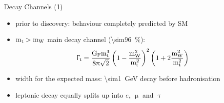 \begin{frame}{Decay Channels (1)}

	\begin{itemize}\itemfill
		\item prior to discovery: behaviour completely predicted by SM
		\item $\text{m}_{\text{t}} > \text{m}_{\text{W}}$ \ra main decay channel (\SI{\sim96}{\%}):
		\begin{equation*} \Upgamma_{\text{t}} = \frac{\text{G}_{\text{F}}\text{m}_{\text{t}}^{3}}{8\uppi\sqrt{2}}\left(1 - \frac{\text{m}_{\text{W}}^{2}}{\text{m}_{\text{t}}^{2}}\right)^{2}\left(1 + 2\frac{\text{m}_{\text{W}}^{2}}{\text{m}_{\text{t}}^{2}}\right)\end{equation*}
		\item width for the expected mass: \SI{\sim1}{\giga\electronvolt} \ra decay before hadronisation
	\end{itemize}
	
	\begin{figure}\vspace*{-10pt}
		\centering
	\end{figure}\vspace*{-10pt}
	
	\begin{itemize}\itemfill
		\item leptonic decay equally splits up into $e$, $\upmu$ and $\uptau$
	\end{itemize}

\end{frame}
